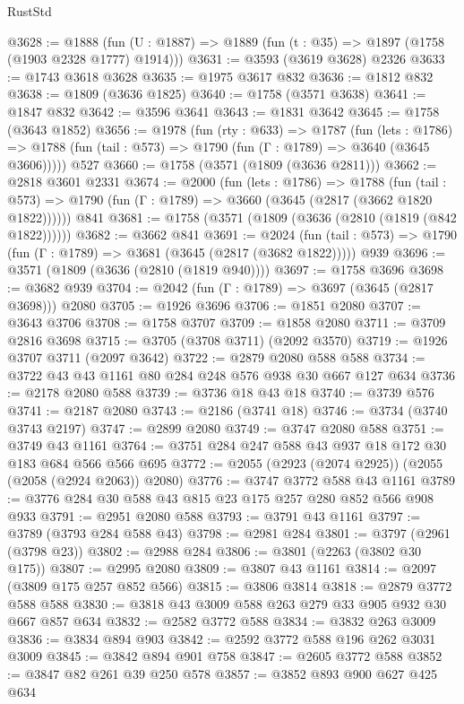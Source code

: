 \begin{lexlean}{RustStd}
\begin{coremodule}
{\begin{coremodule}
{{{{{{{{{{{{{{{@3628 := @1888 (fun (U : @1887) => @1889 (fun (t : @35) => @1897 (@1758 (@1903 @2328 @1777) @1914)))
@3631 := @3593 (@3619 @3628) @2326
@3633 := @1743 @3618 @3628
@3635 := @1975 @3617 @832
@3636 := @1812 @832
@3638 := @1809 (@3636 @1825)
@3640 := @1758 (@3571 @3638)
@3641 := @1847 @832
@3642 := @3596 @3641
@3643 := @1831 @3642
@3645 := @1758 (@3643 @1852)
@3656 := @1978
    (fun (rty : @633) =>
    @1787
      (fun (lets : @1786) =>
      @1788 (fun (tail : @573) => @1790 (fun (Γ : @1789) => @3640 (@3645 @3606)))))
    @527
@3660 := @1758 (@3571 (@1809 (@3636 @2811)))
@3662 := @2818 @3601 @2331
@3674 := @2000
    (fun (lets : @1786) =>
    @1788
      (fun (tail : @573) => @1790 (fun (Γ : @1789) => @3660 (@3645 (@2817 (@3662 @1820 @1822))))))
    @841
@3681 := @1758 (@3571 (@1809 (@3636 (@2810 (@1819 (@842 @1822))))))
@3682 := @3662 @841
@3691 := @2024
    (fun (tail : @573) => @1790 (fun (Γ : @1789) => @3681 (@3645 (@2817 (@3682 @1822)))))
    @939
@3696 := @3571 (@1809 (@3636 (@2810 (@1819 @940))))
@3697 := @1758 @3696
@3698 := @3682 @939
@3704 := @2042 (fun (Γ : @1789) => @3697 (@3645 (@2817 @3698))) @2080
@3705 := @1926 @3696
@3706 := @1851 @2080
@3707 := @3643 @3706
@3708 := @1758 @3707
@3709 := @1858 @2080
@3711 := @3709 @2816 @3698
@3715 := @3705 (@3708 @3711) (@2092 @3570)
@3719 := @1926 @3707 @3711 (@2097 @3642)
@3722 := @2879 @2080 @588 @588
@3734 := @3722 @43 @43 @1161 @80 @284 @248 @576 @938 @30 @667 @127 @634
@3736 := @2178 @2080 @588
@3739 := @3736 @18 @43 @18
@3740 := @3739 @576
@3741 := @2187 @2080
@3743 := @2186 (@3741 @18)
@3746 := @3734 (@3740 @3743 @2197)
@3747 := @2899 @2080
@3749 := @3747 @2080 @588
@3751 := @3749 @43 @1161
@3764 := @3751 @284 @247 @588 @43 @937 @18 @172 @30 @183 @684 @566 @566 @695
@3772 := @2055 (@2923 (@2074 @2925)) (@2055 (@2058 (@2924 @2063)) @2080)
@3776 := @3747 @3772 @588 @43 @1161
@3789 := @3776 @284 @30 @588 @43 @815 @23 @175 @257 @280 @852 @566 @908 @933
@3791 := @2951 @2080 @588
@3793 := @3791 @43 @1161
@3797 := @3789 (@3793 @284 @588 @43)
@3798 := @2981 @284
@3801 := @3797 (@2961 (@3798 @23))
@3802 := @2988 @284
@3806 := @3801 (@2263 (@3802 @30 @175))
@3807 := @2995 @2080
@3809 := @3807 @43 @1161
@3814 := @2097 (@3809 @175 @257 @852 @566)
@3815 := @3806 @3814
@3818 := @2879 @3772 @588 @588
@3830 := @3818 @43 @3009 @588 @263 @279 @33 @905 @932 @30 @667 @857 @634
@3832 := @2582 @3772 @588
@3834 := @3832 @263 @3009
@3836 := @3834 @894 @903
@3842 := @2592 @3772 @588 @196 @262 @3031 @3009
@3845 := @3842 @894 @901 @758
@3847 := @2605 @3772 @588
@3852 := @3847 @82 @261 @39 @250 @578
@3857 := @3852 @893 @900 @627 @425 @634
}}}}}}}}}}}}}}}
\end{coremodule}}
\end{coremodule}
\end{lexlean}

